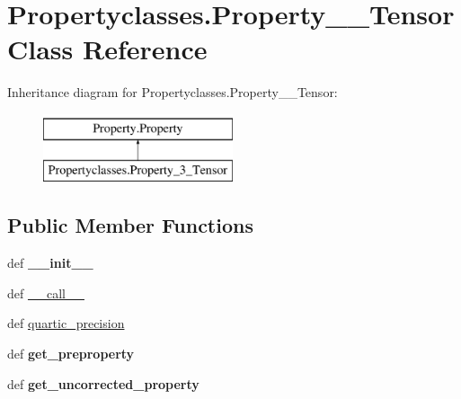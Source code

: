 \hypertarget{classPropertyclasses_1_1Property__3__Tensor}{\section{Propertyclasses.\+Property\+\_\+\_\+\+Tensor Class Reference}
\label{classPropertyclasses_1_1Property__3__Tensor}
}
Inheritance diagram for Propertyclasses.\+Property\+\_\+\_\+\+Tensor\+:\begin{figure}[H]
\begin{center}
\leavevmode
\includegraphics[height=2.000000cm]{classPropertyclasses_1_1Property__3__Tensor}
\end{center}
\end{figure}
\subsection*{Public Member Functions}
\begin{DoxyCompactItemize}
\item 
\hypertarget{classPropertyclasses_1_1Property__3__Tensor_aedf0ffda58fe2e3d50aadc103056d65c}{def {\bfseries \+\_\+\+\_\+init\+\_\+\+\_\+}}\label{classPropertyclasses_1_1Property__3__Tensor_aedf0ffda58fe2e3d50aadc103056d65c}

\item 
def \hyperlink{classPropertyclasses_1_1Property__3__Tensor_adfbcac549c9f1c741ec837421c2f9770}{\+\_\+\+\_\+call\+\_\+\+\_\+}
\item 
def \hyperlink{classPropertyclasses_1_1Property__3__Tensor_aa230b24f6eb3f2403a427d32e8cd7958}{quartic\+\_\+precision}
\item 
\hypertarget{classPropertyclasses_1_1Property__3__Tensor_a56b17dcd36be35d10668a7177e8d11b1}{def {\bfseries get\+\_\+preproperty}}\label{classPropertyclasses_1_1Property__3__Tensor_a56b17dcd36be35d10668a7177e8d11b1}

\item 
\hypertarget{classPropertyclasses_1_1Property__3__Tensor_ad43355e5980b880fbd0365284a39979a}{def {\bfseries get\+\_\+uncorrected\+\_\+property}}\label{classPropertyclasses_1_1Property__3__Tensor_ad43355e5980b880fbd0365284a39979a}

\end{DoxyCompactItemize}
